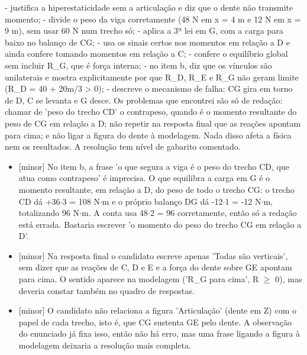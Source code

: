 \documentclass{article}%
\begin{document}
{-} justifica a hiperestaticidade sem a articulação e diz que o dente não transmite momento;\newline%
{-} divide o peso da viga corretamente (48 N em x = 4 m e 12 N em x = 9 m), sem usar 60 N num trecho só;\newline%
{-} aplica a 3ª lei em G, com a carga para baixo no balanço de CG;\newline%
{-} usa os sinais certos nos momentos em relação a D e ainda confere tomando momentos em relação a C;\newline%
{-} confere o equilíbrio global sem incluir R\_G, que é força interna;\newline%
{-} no item b, diz que os vínculos são unilaterais e mostra explicitamente por que R\_D, R\_E e R\_G não geram limite (R\_D = 40 + 20m/3 > 0);\newline%
{-} descreve o mecanismo de falha: CG gira em torno de D, C se levanta e G desce.\newline%
\newline%
Os problemas que encontrei são só de redação: chamar de 'peso do trecho CD' o contrapeso, quando é o momento resultante do peso de CG em relação a D; não repetir na resposta final que as reações apontam para cima; e não ligar a figura do dente à modelagem. Nada disso afeta a física nem os resultados. A resolução tem nível de gabarito comentado.%
\begin{itemize}%
\item%
{[}minor{]} No item b, a frase 'o que segura a viga é o peso do trecho CD, que atua como contrapeso' é imprecisa. O que equilibra a carga em G é o momento resultante, em relação a D, do peso de todo o trecho CG: o trecho CD dá +36$\cdot$3 = 108 N$\cdot$m e o próprio balanço DG dá -12$\cdot$1 = -12 N$\cdot$m, totalizando 96 N$\cdot$m. A conta usa 48$\cdot$2 = 96 corretamente, então só a redação está errada. Bastaria escrever 'o momento do peso do trecho CG em relação a D'.%
\item%
{[}minor{]} Na resposta final o candidato escreve apenas 'Todas são verticais', sem dizer que as reações de C, D e E e a força do dente sobre GE apontam para cima. O sentido aparece na modelagem ('R\_G para cima', R $\geq$ 0), mas deveria constar também no quadro de respostas.%
\item%
{[}minor{]} O candidato não relaciona a figura 'Articulação' (dente em Z) com o papel de cada trecho, isto é, que CG sustenta GE pelo dente. A observação do enunciado já fixa isso, então não há erro, mas uma frase ligando a figura à modelagem deixaria a resolução mais completa.%
\end{itemize}%
\end{document}
